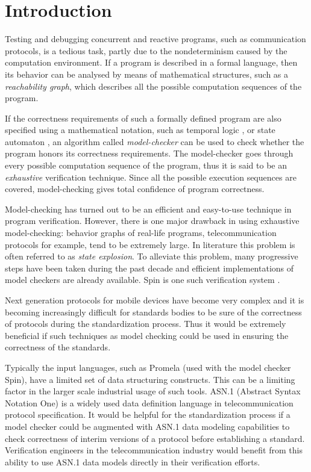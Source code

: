 \documentclass{entcs} \usepackage{entcsmacro}
\begin{document}
\section{Introduction}
Testing and debugging concurrent and reactive programs, such as
communication protocols, is a tedious task, partly due to the
nondeterminism caused by the computation environment. If a program is
described in a formal language, then its behavior can be analysed by
means of mathematical structures, such as a {\em reachability graph},
which describes all the possible computation sequences of the program.

If the correctness requirements of such a formally defined program are
also specified using a mathematical notation, such as temporal logic
\cite{MaPn}, \cite{CTL} or state automaton \cite{Thomas}, an algorithm
called {\em model-checker} \cite{CES} can be used to check whether the
program honors its correctness requirements. The model-checker goes
through every possible computation sequence of the program, thus it is
said to be an {\em exhaustive} verification technique. Since all the
possible execution sequences are covered, model-checking gives total
confidence of program correctness.

Model-checking has turned out to be an efficient and easy-to-use
technique in program verification. However, there is one major
drawback in using exhaustive model-checking: behavior graphs of
real-life programs, telecommunication protocols for example, tend to
be extremely large.  In literature this problem is often referred to
as {\em state explosion}.  To alleviate this problem, many progressive
steps have been taken during the past decade and efficient
implementations of model checkers are already available. Spin is one
such verification system \cite{Spin}.

Next generation protocols for mobile devices have become very complex
and it is becoming increasingly difficult for standards bodies to be
sure of the correctness of protocols during the standardization
process. Thus it would be extremely beneficial if such techniques as
model checking could be used in ensuring the correctness of the
standards.

Typically the input languages, such as Promela (used with
the model checker Spin), have a limited set of data structuring
constructs. This can be a limiting factor in the larger scale industrial
usage of such tools.
ASN.1 (Abstract Syntax Notation One) \cite{asn1} is a widely used data
definition language in telecommunication protocol specification.
It would be helpful for the standardization process if a model
checker could be augmented with ASN.1 data modeling capabilities to
check correctness of interim versions of a protocol before
establishing a standard. Verification engineers in the
telecommunication industry would benefit from this ability to use
ASN.1 data models directly in their verification efforts.
\end{document}
